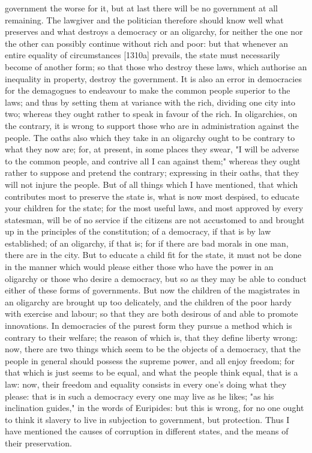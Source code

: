 \documentclass[12pt]{article}
\begin{document}
government the worse for it, but at last there will be no government at all remaining. The lawgiver and the politician therefore should know well what preserves and what destroys a democracy or an oligarchy, for neither the one nor the other can possibly continue without rich and poor: but that whenever an entire equality of circumstances [1310a] prevails, the state must necessarily become of another form; so that those who destroy these laws, which authorise an inequality in property, destroy the government. It is also an error in democracies for the demagogues to endeavour to make the common people superior to the laws; and thus by setting them at variance with the rich, dividing one city into two; whereas they ought rather to speak in favour of the rich. In oligarchies, on the contrary, it is wrong to support those who are in administration against the people. The oaths also which they take in an oligarchy ought to be contrary to what they now are; for, at present, in some places they swear, "I will be adverse to the common people, and contrive all I can against them;" whereas they ought rather to suppose and pretend the contrary; expressing in their oaths, that they will not injure the people. But of all things which I have mentioned, that which contributes most to preserve the state is, what is now most despised, to educate your children for the state; for the most useful laws, and most approved by every statesman, will be of no service if the citizens are not accustomed to and brought up in the principles of the constitution; of a democracy, if that is by law established; of an oligarchy, if that is; for if there are bad morals in one man, there are in the city. But to educate a child fit for the state, it must not be done in the manner which would please either those who have the power in an oligarchy or those who desire a democracy, but so as they may be able to conduct either of these forms of governments. But now the children of the magistrates in an oligarchy are brought up too delicately, and the children of the poor hardy with exercise and labour; so that they are both desirous of and able to promote innovations. In democracies of the purest form they pursue a method which is contrary to their welfare; the reason of which is, that they define liberty wrong: now, there are two things which seem to be the objects of a democracy, that the people in general should possess the supreme power, and all enjoy freedom; for that which is just seems to be equal, and what the people think equal, that is a law: now, their freedom and equality consists in every one's doing what they please: that is in such a democracy every one may live as he likes; "as his inclination guides," in the words of Euripides: but this is wrong, for no one ought to think it slavery to live in subjection to government, but protection. Thus I have mentioned the causes of corruption in different states, and the means of their preservation.
\end{document}
